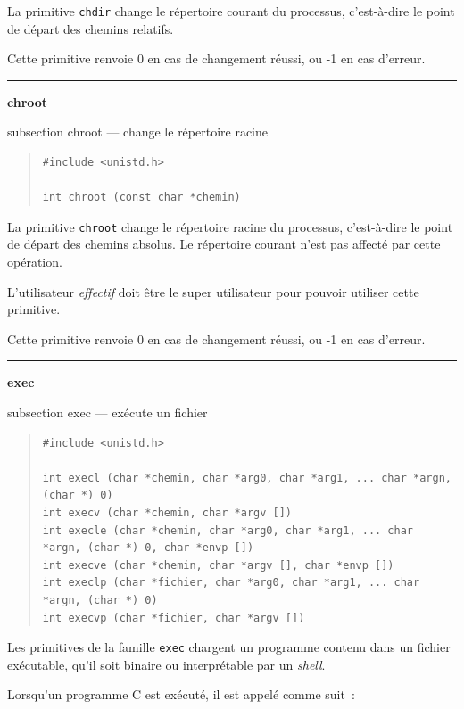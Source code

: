 \documentclass [twoside] {report}
\newcommand {\primitive} [1]
    {
	\phantomsection
	{\large \textbf {#1}}
	\addcontentsline {toc} {subsection} {#1}
    }
\newcommand {\separation}
    {
	\vspace {5mm}
	\nopagebreak
	\hrule
    }
\begin{document}
La primitive \texttt {chdir} change le répertoire
courant du processus, c'est-à-dire le point de
départ des chemins relatifs.

Cette primitive renvoie 0 en cas de changement
réussi, ou -1 en cas d'erreur.




\separation
\primitive {chroot} --- change le répertoire racine

\begin {quote}
\begin {verbatim}
#include <unistd.h>

int chroot (const char *chemin)
\end{verbatim}
\end {quote}

La primitive \texttt {chroot} change le répertoire
racine du processus, c'est-à-dire le point de
départ des chemins absolus. Le répertoire courant
n'est pas affecté par cette opération.

L'utilisateur \emph {effectif} doit être le super
utilisateur pour pouvoir utiliser cette primitive.

Cette primitive renvoie 0 en cas de changement
réussi, ou -1 en cas d'erreur.




\separation
\primitive {exec} --- exécute un fichier

\begin {quote}
\begin {verbatim}
#include <unistd.h>

int execl (char *chemin, char *arg0, char *arg1, ... char *argn, (char *) 0)
int execv (char *chemin, char *argv [])
int execle (char *chemin, char *arg0, char *arg1, ... char *argn, (char *) 0, char *envp [])
int execve (char *chemin, char *argv [], char *envp [])
int execlp (char *fichier, char *arg0, char *arg1, ... char *argn, (char *) 0)
int execvp (char *fichier, char *argv [])
\end{verbatim}
\end {quote}

Les primitives de la famille \texttt {exec} chargent un
programme contenu dans un fichier exécutable,
qu'il soit binaire ou interprétable par un
\emph {shell}.

Lorsqu'un programme C est exécuté, il est appelé
comme suit~:
\end{document}
